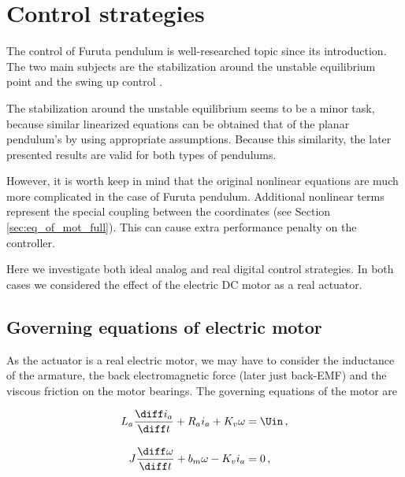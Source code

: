 \chapter{Control strategies} \label{chap:control}


The control of Furuta pendulum is well-researched topic since its introduction. The two main subjects are the stabilization around the unstable equilibrium point and the swing up control \cite{furuta1991swing,furuta1992swing}. 


The stabilization around the unstable equilibrium seems to be a minor task, because similar linearized equations can be obtained that of the planar pendulum's by using appropriate assumptions. Because this similarity, the later presented results are valid for both types of pendulums.

However, it is worth keep in mind  that the original nonlinear equations are much more complicated in the case of Furuta pendulum. Additional nonlinear terms represent the special coupling between the coordinates (see Section \ref{sec:eq_of_mot_full}). This can cause extra performance penalty on the controller.


Here we investigate both ideal analog and real digital control strategies. In both cases we considered the effect of the electric DC motor as a real actuator.





\section{Governing equations of electric motor}\label{Sec:electric_motor}

As the actuator is a real electric motor, we may have to consider the inductance of the armature, the back electromagnetic force (later just back-EMF) and the viscous friction on the motor bearings. The governing equations of the motor are

\begin{align}
		L_a \dfrac{\diff i_a}{\diff t} + R_a i_a + K_v \omega &= \Uin\,, \\[2ex]
		J \dfrac{\diff \omega}{\diff t} + b_m \omega - K_v i_a &= 0\,, 
\end{align}

